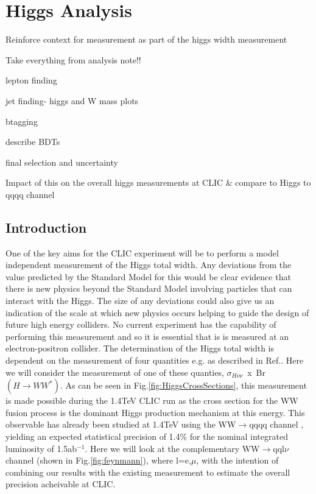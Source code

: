 \chapter{Higgs Analysis}
\label{Higgs Analysis}
Reinforce context for measurement as part of the higgs width measurement

Take everything from analysis note!!

lepton finding

jet finding- higgs and W mass plots

btagging

describe BDTs

final selection and uncertainty

Impact of this on the overall higgs measurements at CLIC \& compare to Higgs to qqqq channel

\section{Introduction}
One of the key aims for the CLIC experiment will be to perform a model independent measurement of the Higgs total width. Any deviations from the value predicted by the Standard Model for this would be clear evidence that there is new physics beyond the Standard Model involving particles that can interact with the Higgs. The size of any deviations could also give us an indication of the scale at which new physics occurs helping to guide the design of future high energy colliders. No current experiment has the capability of performing this measurement and so it is essential that is is measured at an electron-positron collider. The determination of the Higgs total width is dependent on the measurement of four quantities e.g. as described in Ref.\cite{Durig:2014lfa}. Here we will consider the measurement of one of these quanties, $\sigma_{H\nu\nu}$~x~Br$(H\rightarrow WW^*)$. As can be seen in Fig.\ref{fig:HiggsCrossSections}, this measurement is made possible during the 1.4TeV CLIC run as the cross section for the WW fusion process is the dominant Higgs production mechanism at this energy. This observable has already been studied at 1.4TeV using the WW$\rightarrow$qqqq channel \cite{Pandurovic:2011508}, yielding an expected statistical precision of 1.4\% for the nominal integrated luminosity of 1.5ab$^{-1}$. Here we will look at the complementary WW$\rightarrow$qql$\nu$ channel (shown in Fig.\ref{fig:feynmann}), where l=e,$\mu$, with the intention of combining our results with the existing measurement to estimate the overall precision acheivable at CLIC. 


